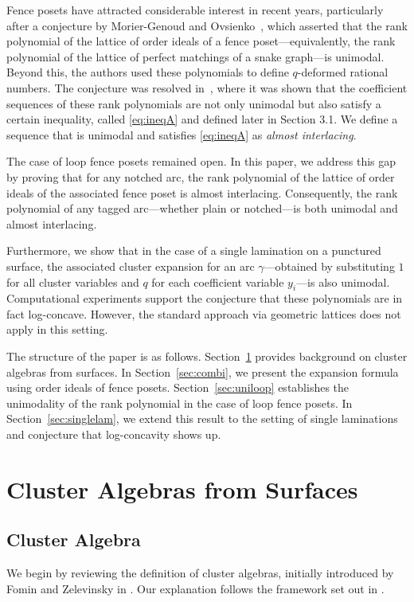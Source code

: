 \documentclass{article}
\theoremstyle{remark}
\begin{document}
Fence posets have attracted considerable interest in recent years, particularly after a conjecture by Morier-Genoud and Ovsienko~\cite{MGO20}, which asserted that the rank polynomial of the lattice of order ideals of a fence poset---equivalently, the rank polynomial of the lattice of perfect matchings of a snake graph---is unimodal. Beyond this, the authors used these polynomials to define \( q \)-deformed rational numbers. The conjecture was resolved in~\cite{OR23}, where it was shown that the coefficient sequences of these rank polynomials are not only unimodal but also satisfy a certain inequality, called \eqref{eq:ineqA} and defined later in Section 3.1. We define a sequence that is unimodal and satisfies \eqref{eq:ineqA} as \emph{almost interlacing}.

The case of loop fence posets remained open. In this paper, we address this gap by proving that for any notched arc, the rank polynomial of the lattice of order ideals of the associated fence poset is almost interlacing. Consequently, the rank polynomial of any tagged arc---whether plain or notched---is both unimodal and almost interlacing.

Furthermore, we show that in the case of a single lamination on a punctured surface, the associated cluster expansion for an arc $\gamma$—obtained by substituting $1$ for all cluster variables and $q$ for each coefficient variable $y_i$—is also unimodal. Computational experiments support the conjecture that these polynomials are in fact log-concave. However, the standard approach via geometric lattices does not apply in this setting.

The structure of the paper is as follows. Section~\ref{sec:cluster_algebra} provides background on cluster algebras from surfaces. In Section~\ref{sec:combi}, we present the expansion formula using order ideals of fence posets. Section~\ref{sec:uniloop} establishes the unimodality of the rank polynomial in the case of loop fence posets. In Section~\ref{sec:singlelam}, we extend this result to the setting of single laminations and conjecture that log-concavity shows up.

\section{Cluster Algebras from Surfaces}\label{sec:cluster_algebra}

\subsection{Cluster Algebra}
We begin by reviewing the definition of cluster algebras, initially introduced by Fomin and Zelevinsky in \cite{FZ2002}. Our explanation follows the framework set out in \cite{FZ2007}.
\end{document}
